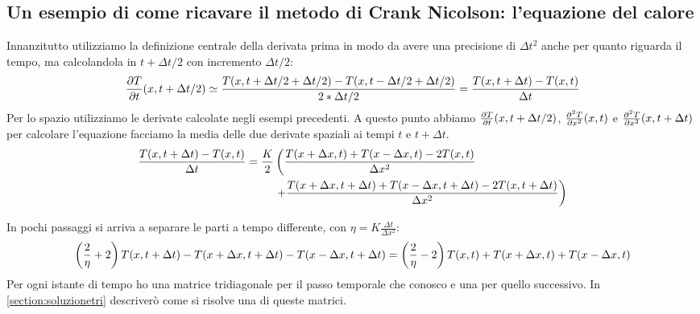 \subsection{Un esempio di come ricavare il metodo di Crank Nicolson: l'equazione del calore}
Innanzitutto utilizziamo la definizione centrale della derivata prima in modo da avere una precisione di $\Delta t^2$ anche per quanto riguarda il tempo, ma  calcolandola in $t+\Delta t/2$ con incremento $\Delta t/2$:
\begin{equation}
  \pde{T}t(x,t+\Delta t/2) \simeq \frac{T(x,t+\Delta t/2+\Delta t/2)-T(x,t-\Delta t/2+\Delta t/2)}{2*\Delta t/2} = \frac{T(x,t+\Delta t)-T(x,t)}{\Delta t}
\end{equation}
Per lo spazio utilizziamo le derivate calcolate negli esempi precedenti.
A questo punto abbiamo $\pde{T}t(x,t+\Delta t/2)$, $\pde{^2T}{x^2}(x,t)$ e $\pde{^2T}{x^2}(x,t+\Delta t)$ per calcolare l'equazione facciamo la media delle due derivate spaziali ai tempi $t$ e $t+\Delta t$.
\begin{equation}\label{eq:HeatForCrank}
  \begin{aligned}
    \frac{T(x,t+\Delta t)-T(x,t)}{\Delta t} = \frac K2 &\lr(.{\frac{T(x+\Delta x,t)+T(x-\Delta x,t)-2T(x,t)}{\Delta x^2}}\\
    &\lr.){+\frac{T(x+\Delta x,t+\Delta t)+T(x-\Delta x,t+\Delta t)-2T(x,t+\Delta t)}{\Delta x^2}}
  \end{aligned}
\end{equation}

In pochi passaggi si arriva a separare le parti a tempo differente, con $\eta = K\frac{\Delta t}{\Delta x^2}$:
\begin{equation}
  \lrt{\frac 2\eta +2}T(x,t+\Delta t) -T(x+\Delta x,t+\Delta t)-T(x-\Delta x,t+\Delta t) = \lrt{\frac 2\eta -2}T(x,t)+T(x+\Delta x,t)+T(x-\Delta x,t)
\end{equation}
Per ogni istante di tempo ho una matrice tridiagonale per il passo temporale che conosco e una per quello successivo. In \autoref{section:soluzionetri} descriver\`o come si risolve una di queste matrici.
